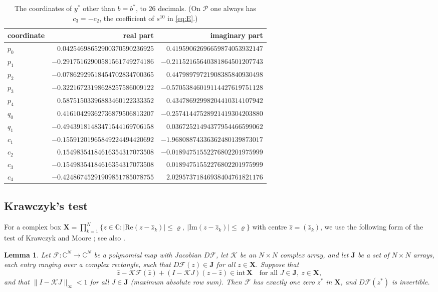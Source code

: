 \documentclass[11pt]{amsart}
\newtheorem{lemma}[theorem]{Lemma}
\theoremstyle{definition}
\theoremstyle{remark}
\numberwithin{equation}{section}
\newcommand{\C}{\mathbb{C}}
\newcommand{\cP}{\mathcal{P}}
\begin{document}
\begin{table}[ht]
\centering\small
\begin{tabular}{lrr}
\toprule
coordinate & real part & imaginary part\\
\midrule
$p_0$ & $0.04254698652900370590236925$ & $0.41959062696659874053932147$ \\
$p_1$ & $-0.29175162900581561749274186$ & $-0.21152165640381864501207743$ \\
$p_2$ & $-0.07862929518454702834700365$ & $0.44798979721908385840930498$ \\
$p_3$ & $-0.32216723198628257586009122$ & $-0.57053846019114427619751128$ \\
$p_4$ & $0.58751503396883460122333352$ & $0.43478692998204410314107942$ \\
$q_0$ & $0.41610429362736879506813207$ & $-0.25741447528921419304203880$ \\
$q_1$ & $-0.49439181483471544169706158$ & $0.03672521494377954466599062$ \\
$c_1$ & $-0.15591201965849224494420692$ & $-1.96808874336362480139873017$ \\
$c_2$ & $0.15498354184616354317073508$ & $-0.01894751552276802201975999$ \\
$c_3$ & $-0.15498354184616354317073508$ & $0.01894751552276802201975999$ \\
$c_4$ & $-0.42486745291909851785078755$ & $2.02957371846938404761821176$ \\
\bottomrule
\end{tabular}
\caption{The coordinates of $y^*$ other than $b=b^*$, to $26$ decimals. (On $\cP$ one always has $c_3=-c_2$, the coefficient of $s^{10}$ in \eqref{eq:E}.)}
\label{tab:point}
\end{table}

\subsection{Krawczyk's test}
For a complex box $\mathbf X=\prod_{k=1}^{N}\{z\in\C:|\mathrm{Re}(z-\hat z_k)|\le\varrho,\ |\mathrm{Im}(z-\hat z_k)|\le\varrho\}$ with centre $\hat z=(\hat z_k)$, we use the following form of the test of Krawczyk and Moore \cite{Kr69,Mo77}; see also \cite{MKC09}.

\begin{lemma}\label{lem:krawczyk}
Let $\mathcal F\colon\C^N\to\C^N$ be a polynomial map with Jacobian $D\mathcal F$, let $\mathcal K$ be an $N\times N$ complex array, and let $\mathbf J$ be a set of $N\times N$ arrays, each entry ranging over a complex rectangle, such that $D\mathcal F(z)\in\mathbf J$ for all $z\in\mathbf X$. Suppose that
\[
\hat z-\mathcal K\mathcal F(\hat z)+(I-\mathcal KJ)(z-\hat z)\in\mathrm{int}\,\mathbf X\quad\text{for all }J\in\mathbf J,\ z\in\mathbf X,
\]
and that $\|I-\mathcal KJ\|_\infty<1$ for all $J\in\mathbf J$ (maximum absolute row sum). Then $\mathcal F$ has exactly one zero $z^*$ in $\mathbf X$, and $D\mathcal F(z^*)$ is invertible.
\end{lemma}
\end{document}
